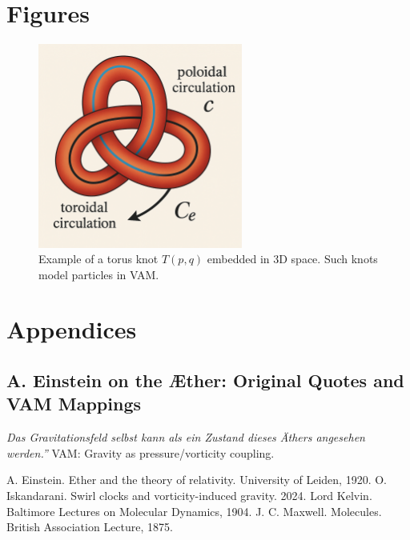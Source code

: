 \documentclass[12pt]{article}
\begin{document}
    \section*{Figures}
    \begin{figure}[h!]
        \centering
        \includegraphics[width=0.6\textwidth]{../images/ChatGPT}
        \caption{Example of a torus knot $T(p,q)$ embedded in 3D space. Such knots model particles in VAM.}
    \end{figure}

    \section*{Appendices}
    \subsection*{A. Einstein on the Æther: Original Quotes and VAM Mappings}
    \textit{\grqq Das Gravitationsfeld selbst kann als ein Zustand dieses Äthers angesehen werden.\textquotedblright} \rightarrow VAM: Gravity as pressure/vorticity coupling.

    
    \begin{thebibliography}{10}
         A. Einstein. Ether and the theory of relativity. University of Leiden, 1920.
         O. Iskandarani. Swirl clocks and vorticity-induced gravity. 2024.
         Lord Kelvin. Baltimore Lectures on Molecular Dynamics, 1904.
         J. C. Maxwell. Molecules. British Association Lecture, 1875.
    \end{thebibliography}
\end{document}
